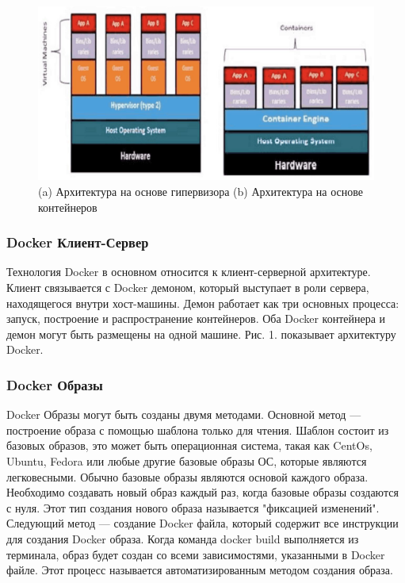 \documentclass{mirea}
\begin{document}
	\begin{figure}[H]
		\centering
		\includegraphics[width=\textwidth]{img2}
		\parskip=6pt
		\caption{(a) Архитектура на основе гипервизора (b) Архитектура на основе контейнеров}
		\label{fig:pic2}
	\end{figure}

	\subsubsection{Docker Клиент-Сервер}
	
	Технология Docker в основном относится к клиент-серверной архитектуре. Клиент связывается с Docker демоном, который выступает в роли сервера, находящегося внутри хост-машины. Демон работает как три основных процесса: запуск, построение и распространение контейнеров. Оба Docker контейнера и демон могут быть размещены на одной машине. Рис. 1. показывает архитектуру Docker.
	
	\subsubsection{Docker Образы}
	
	Docker Образы могут быть созданы двумя методами. Основной метод — построение образа с помощью шаблона только для чтения. Шаблон состоит из базовых образов, это может быть операционная система, такая как CentOs, Ubuntu, Fedora или любые другие базовые образы ОС, которые являются легковесными. Обычно базовые образы являются основой каждого образа. Необходимо создавать новый образ каждый раз, когда базовые образы создаются с нуля. Этот тип создания нового образа называется "фиксацией изменений". Следующий метод — создание Docker файла, который содержит все инструкции для создания Docker образа. Когда команда docker build выполняется из терминала, образ будет создан со всеми зависимостями, указанными в Docker файле. Этот процесс называется автоматизированным методом создания образа.
	
\end{document}
